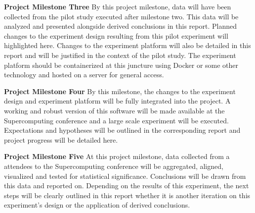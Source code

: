\vspace{1.5ex}\noindent\textbf{Project Milestone Three}
By this project milestone, data will have been collected from the pilot study executed after milestone two. This data will be analyzed and presented alongside derived conclusions in this report. Planned changes to the experiment design resulting from this pilot experiment  will highlighted here. Changes to the experiment platform will also be detailed in this report and will be justified in the context of the pilot study. The experiment platform should be containerized at this juncture using Docker or some other technology and hosted on a server for general access. 

\vspace{1.5ex}\noindent\textbf{Project Milestone Four} 
By this milestone, the changes to the experiment design and experiment platform will be fully integrated into the project. A working and robust version of this software will be made available at the Supercomputing conference and a large scale experiment will be executed. Expectations and hypotheses will be outlined in the corresponding report and project progress will be detailed here.


\vspace{1.5ex}\noindent\textbf{Project Milestone Five} 
At this project milestone, data collected from a attendees to the Supercomputing conference will be aggregated, aligned, visualized and tested for statistical significance. Conclusions will be drawn from this data and reported on. Depending on the results of this experiment, the next steps will be clearly outlined in this report whether it is another iteration on this experiment's design or the application of derived conclusions.





